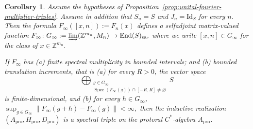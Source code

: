 \documentclass[11pt]{amsart}
\newtheorem{corollary}[theorem]{Corollary}
\theoremstyle{definition}
\theoremstyle{remark}
\newcommand{\Z}{\mathbb{Z}}
\newcommand{\id}{\mathrm{Id}}
\newcommand{\ex}{\mathrm{pro}}
\newcommand{\End}{\mathrm{End}}
\begin{document}
\begin{corollary}%
\label{cor:limit-multiplier-criterion}
Assume the hypotheses of Proposition~\ref{prop:unital-fourier-multiplier-triples}.
Assume in addition that $S_n=S$ and $J_n=\id_S$
for every $n$.
Then the formula $F_\infty([x,n]):=F_n(x)$
defines a selfadjoint matrix-valued function $F_\infty\colon
G_\infty:=\varinjlim(\Z^{m_n},M_n)\to \End(S)_{\mathrm{sa}},
$ where we write $[x,n]\in G_\infty$ for the
class of $x\in\Z^{m_n}$.

If $F_\infty$ has (a)  finite spectral multiplicity in bounded intervals; and (b) bounded
translation increments, that is (a)
for every $R>0$, the vector space
\[
\bigoplus_{\substack{g\in G_\infty\\
\operatorname{Spec}(F_\infty(g))\cap[-R,R]\neq\varnothing}}
S
\]
is finite-dimensional, and (b) for every
$h\in G_\infty$, $\sup_{g\in G_\infty}
\|F_\infty(g+h)-F_\infty(g)\|<\infty,
$
then the inductive realization
$(A_\ex,H_\ex,D_\ex)$
is a spectral triple on the protoral $C^*$-algebra $A_\ex$.
\end{corollary}
\end{document}
